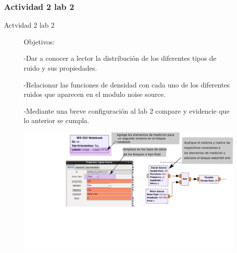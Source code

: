 \subsubsection{Actividad 2 lab 2}

\begin{frame}{Actvidad 2 lab 2}
\begin{figure}[H]
\begin{flushleft}
Objetivos:
\end{flushleft}
\begin{flushleft}
-Dar a conocer a lector la distribución  de los diferentes tipos de ruido y sus propiedades.
\end{flushleft}
\begin{flushleft}
-Relacionar las funciones de densidad con cada uno de los diferentes ruidos que aparecen en el modulo noise source.
\end{flushleft}
\begin{flushleft}
-Mediante una breve configuración al lab 2 compare y evidencie que lo anterior se cumpla.
\end{flushleft}

\begin{center}
\centering
\includegraphics[width=\textwidth, height=0.58\textwidth]{parte1/lab2/pdf/lab2_18.pdf}
\end{center}
\end{figure}
\end{frame}
